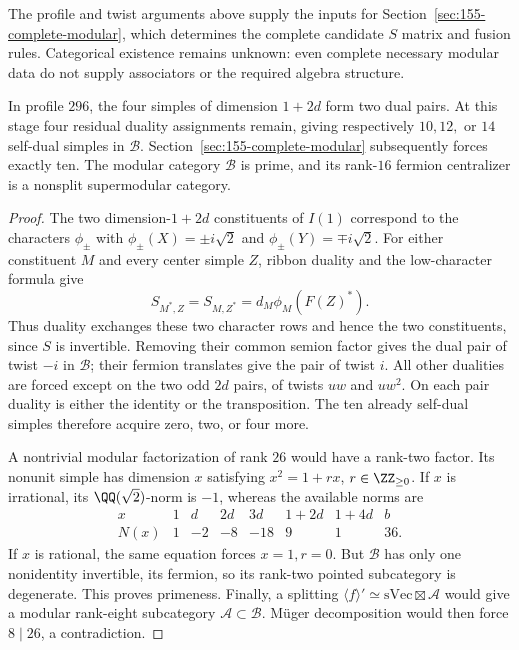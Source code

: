 \begin{remark}
The profile and twist arguments above supply the inputs for
Section~\ref{sec:155-complete-modular}, which determines the complete
candidate $S$ matrix and fusion rules. Categorical existence remains
unknown: even complete necessary modular data do not supply associators
or the required algebra structure.
\end{remark}

\begin{proposition}
\label{prop:155-prime-centralizer}
In profile $296$, the four simples of dimension $1+2d$ form two dual
pairs. At this stage four residual duality assignments remain, giving respectively
$10,12,$ or $14$ self-dual simples in $\mathcal B$.
Section~\ref{sec:155-complete-modular} subsequently forces exactly ten.
The modular category $\mathcal B$ is prime, and its rank-$16$ fermion
centralizer is a nonsplit supermodular category.
\end{proposition}
\begin{proof}
The two dimension-$1+2d$ constituents of $I(1)$ correspond to the
characters $\phi_\pm$ with
$\phi_\pm(X)=\pm i\sqrt2$ and $\phi_\pm(Y)=\mp i\sqrt2$.
For either constituent $M$ and every center simple $Z$, ribbon duality
and the low-character formula give
\[
 S_{M^*,Z}=S_{M,Z^*}
   =d_M\phi_M(F(Z)^*).
\]
Thus duality exchanges these two character rows and hence the two
constituents, since $S$ is invertible. Removing their common semion
factor gives the dual pair of twist $-i$ in $\mathcal B$; their fermion
translates give the pair of twist $i$. All other dualities are forced
except on the two odd $2d$ pairs, of twists $uw$ and $uw^2$.
On each pair duality is either the identity or the transposition. The
ten already self-dual simples therefore acquire zero, two, or four more.

A nontrivial modular factorization of rank $26$ would have a rank-two
factor. Its nonunit simple has dimension $x$ satisfying
$x^2=1+rx$, $r\in\ZZ_{\ge0}$. If $x$ is irrational, its
$\QQ(\sqrt2)$-norm is $-1$, whereas the available norms are
\[
\begin{array}{c|rrrrrrr}
 x&1&d&2d&3d&1+2d&1+4d&b\\\hline
 N(x)&1&-2&-8&-18&9&1&36.
\end{array}
\]
If $x$ is rational, the same equation forces $x=1,r=0$. But
$\mathcal B$ has only one nonidentity invertible, its fermion, so its
rank-two pointed subcategory is degenerate. This proves primeness.
Finally, a splitting $\langle f\rangle'\simeq
\mathrm{sVec}\boxtimes\mathcal A$ would give a modular rank-eight
subcategory $\mathcal A\subset\mathcal B$. M\"uger decomposition
\cite{DGNO} would then force $8\mid26$, a contradiction.
\end{proof}

